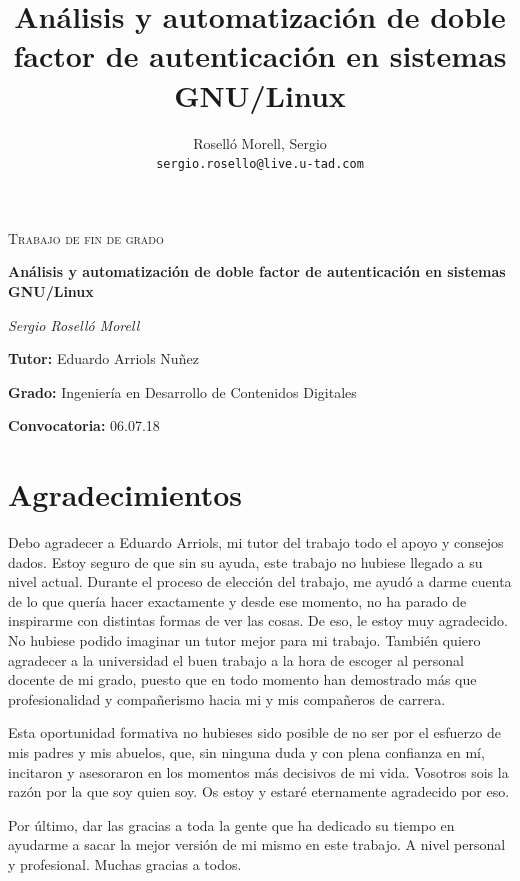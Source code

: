 \documentclass[twoside, titlepage, 12pt, a4paper]{article}
\title{Análisis y automatización de doble factor de autenticación en sistemas GNU/Linux}
\author{Roselló Morell, Sergio\\
\texttt{sergio.rosello@live.u-tad.com}}
\let\oldsection\section
\def\section{\cleardoublepage\oldsection}
\begin{document}
\begin{titlepage}
	\centering
	\begin{figure}
		\centering
		\qquad
	\end{figure}\par\vspace{1cm}
	{\scshape\Large Trabajo de fin de grado\par}
	\vspace{1.5cm}
	{\huge\bfseries Análisis y automatización de doble factor de autenticación en sistemas GNU/Linux\par}
	\vspace{2cm}
	{\Large\itshape Sergio Roselló Morell\par}
	\vfill
	\raggedright
	\textbf{Tutor:} Eduardo Arriols Nuñez\par
	\textbf{Grado:} Ingeniería en Desarrollo de Contenidos Digitales\par
	\textbf{Convocatoria:} 06.07.18\par

	\vfill

\end{titlepage}
\section*{Agradecimientos}
Debo agradecer a Eduardo Arriols, mi tutor del trabajo todo el apoyo y consejos dados. Estoy seguro de que sin su ayuda, este trabajo no hubiese llegado a su nivel actual. Durante el proceso de elección del trabajo, me ayudó a darme cuenta de lo que quería hacer exactamente y desde ese momento, no ha parado de inspirarme con distintas formas de ver las cosas. De eso, le estoy muy agradecido. No hubiese podido imaginar un tutor mejor para mi trabajo.
También quiero agradecer a la universidad el buen trabajo a la hora de escoger al personal docente de mi grado, puesto que en todo momento han demostrado más que profesionalidad y compañerismo hacia mi y mis compañeros de carrera.\par
Esta oportunidad formativa no hubieses sido posible de no ser por el esfuerzo de mis padres y mis abuelos, que, sin ninguna duda y con plena confianza en mí, incitaron y asesoraron en los momentos más decisivos de mi vida. Vosotros sois la razón por la que soy quien soy. Os estoy y estaré eternamente agradecido por eso.\par
Por último, dar las gracias a toda la gente que ha dedicado su tiempo en ayudarme a sacar la mejor versión de mi mismo en este trabajo. A nivel personal y profesional. Muchas gracias a todos.
\clearpage
\end{document}
